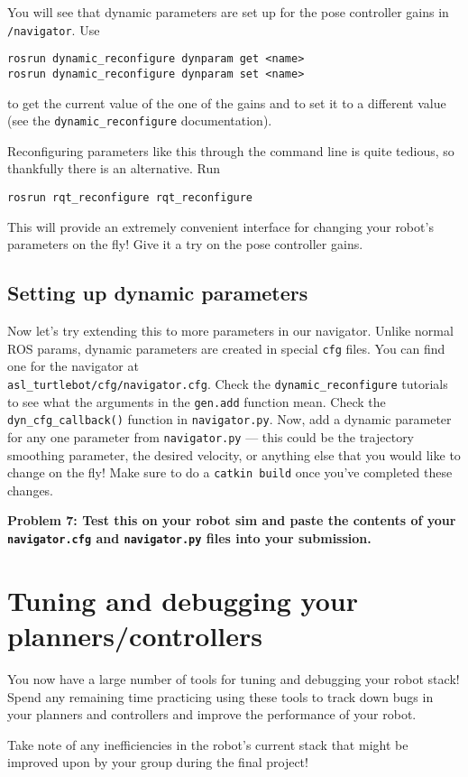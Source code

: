 \documentclass{article}
\begin{document}
You will see that dynamic parameters are set up for the pose controller gains in \texttt{/navigator}. Use 
\begin{lstlisting}
rosrun dynamic_reconfigure dynparam get <name>
rosrun dynamic_reconfigure dynparam set <name>
\end{lstlisting}

to get the current value of the one of the gains and to set it to a different value (see the \texttt{dynamic\_reconfigure} documentation).

Reconfiguring parameters like this through the command line is quite tedious, so thankfully there is an alternative. Run
\begin{lstlisting}
rosrun rqt_reconfigure rqt_reconfigure
\end{lstlisting}

This will provide an extremely convenient interface for changing your robot's parameters on the fly! Give it a try on the pose controller gains.

\subsection{Setting up dynamic parameters}
Now let's try extending this to more parameters in our navigator. Unlike normal ROS params, dynamic parameters are created in special \texttt{cfg} files. You can find one for the navigator at \\ \texttt{asl\_turtlebot/cfg/navigator.cfg}. Check the \texttt{dynamic\_reconfigure} tutorials to see what the arguments in the \texttt{gen.add} function mean. Check the \texttt{dyn\_cfg\_callback()} function in \texttt{navigator.py}. Now, add a dynamic parameter for any one parameter from \texttt{navigator.py} --- this could be the trajectory smoothing parameter, the desired velocity, or anything else that you would like to change on the fly! Make sure to do a \texttt{catkin build} once you've completed these changes.

{\bf Problem 7: Test this on your robot sim and paste the contents of your \texttt{navigator.cfg} and \texttt{navigator.py} files into your submission.}

\section{Tuning and debugging your planners/controllers}
You now have a large number of tools for tuning and debugging your robot stack! Spend any remaining time practicing using these tools to track down bugs in your planners and controllers and improve the performance of your robot.

Take note of any inefficiencies in the robot's current stack that might be improved upon by your group during the final project!
\end{document}
